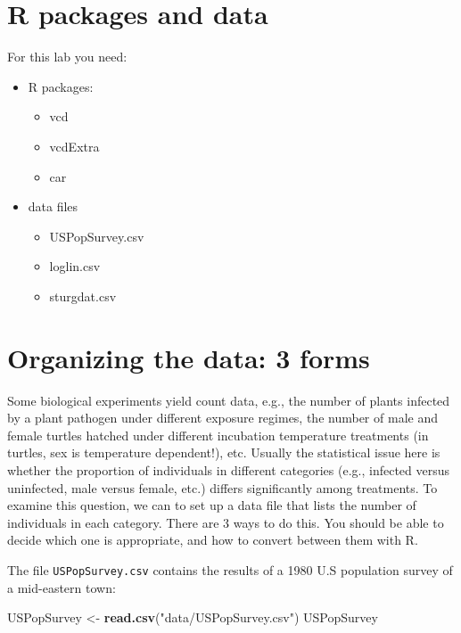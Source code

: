 \documentclass[
  12pt,
]{book}
\newenvironment{Shaded}{\begin{snugshade}}{\end{snugshade}}
\newcommand{\KeywordTok}[1]{\textcolor[rgb]{0.13,0.29,0.53}{\textbf{#1}}}
\newcommand{\NormalTok}[1]{#1}
\newcommand{\StringTok}[1]{\textcolor[rgb]{0.31,0.60,0.02}{#1}}
\providecommand{\tightlist}{%
  \setlength{\itemsep}{0pt}\setlength{\parskip}{0pt}}
\begin{document}
\hypertarget{set-freq}{%
\section{R packages and data}\label{set-freq}}

For this lab you need:

\begin{itemize}
\tightlist
\item
  R packages:

  \begin{itemize}
  \tightlist
  \item
    vcd
  \item
    vcdExtra
  \item
    car
  \end{itemize}
\item
  data files

  \begin{itemize}
  \tightlist
  \item
    USPopSurvey.csv
  \item
    loglin.csv
  \item
    sturgdat.csv
  \end{itemize}
\end{itemize}

\hypertarget{organizing-the-data-3-forms}{%
\section{Organizing the data: 3 forms}\label{organizing-the-data-3-forms}}

Some biological experiments yield count data, e.g., the number of plants infected by a plant pathogen under different exposure regimes, the number of male and female turtles hatched under different incubation temperature treatments (in turtles, sex is temperature dependent!), etc. Usually the statistical issue here is whether the proportion of individuals in different categories (e.g., infected versus uninfected, male versus female, etc.) differs significantly among treatments. To examine this question, we can to set up a data file that lists the number of individuals in each category. There are 3 ways to do this. You should be able to decide which one is appropriate, and how to convert between them with R.

The file \texttt{USPopSurvey.csv} contains the results of a 1980 U.S population survey of a mid-eastern town:

\begin{Shaded}
\begin{Highlighting}[]
\NormalTok{USPopSurvey \textless{}{-}}\StringTok{ }\KeywordTok{read.csv}\NormalTok{(}\StringTok{"data/USPopSurvey.csv"}\NormalTok{)}
\NormalTok{USPopSurvey}
\end{Highlighting}
\end{Shaded}
\end{document}
